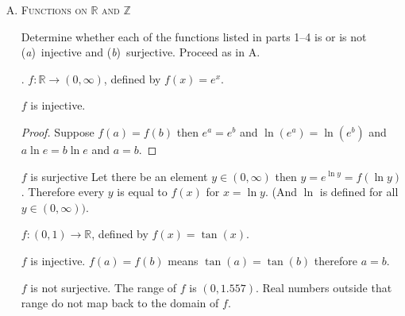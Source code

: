 \documentclass[twoside]{amsart}
\newcommand{\solution}{\textsc{Solution}\xspace}
\begin{document}
\begin{enumerate}[A.]
   . $f(x) = \displaystyle
      \begin{cases}
         2x      &\text{if $x$ is an integer}\\
	 \phantom{2}x &\text{otherwise}
      \end{cases}$

   \noindent $f$ is injective. 
   \begin{proof}
   $f(x)$ is an integer iff $x$ is an integer. Suppose $f(a)=f(b)$ and
   $f(a)$ is an integer. Then $2a=2b$ and $a=b$. Now suppose $f(a)=f(b)$
   and $f(a)$ is not an integer. Then $a=b$.
   \end{proof}

   \noindent $f$ is not surjective. For example, there is no value of
   $x$ for which $f(x)=1$. Why not? Well there are only two values that
   are even worthy of consideration: 1/2 and 1. But $f(1/2)=1/2$ because
   $1/2$ is not an integer; and $f(1)=2$ because 1 is an integer.

   . Determine the range of each of the functions in parts 1 to 6.

   \noindent \solution 1) $\mathbb{R}$, 2) $\mathbb{R}$, 3)
   $\{x: x\in\mathbb{R}, x\ge0\}$, (non-negative reals) 4) $\mathbb{R}$,
   5) $\mathbb{R}$ 6) the reals minus the odd integers.

   \item \textsc{Functions on} $\mathbb{R}$ \textsc{and} $\mathbb{Z}$

   \noindent Determine whether each of the functions listed in parts
   1--4 is or is not (\emph{a})~injective and (\emph{b})~surjective. 
   Proceed as in A.

   . $f:\mathbb{R}\to(0,\infty)$, defined by $f(x)=e^x$.

   \noindent $f$ is injective.
   \begin{proof}
   Suppose $f(a)=f(b)$ then $e^a=e^b$ and $\ln(e^a)=\ln(e^b)$ and
   $a\ln e = b\ln e$ and $a=b$.
   \end{proof}

   \noindent $f$ is surjective
   Let there be an element $y \in (0,\infty)$ then $y=e^{\ln y}=f(\ln y)$.
   Therefore every $y$ is equal to $f(x)$ for $x=\ln y$. (And $\ln$ is defined
   for all $y \in (0,\infty))$.

    $f:(0,1)\to\mathbb{R}$, defined by $f(x)=\tan(x)$.

   \noindent $f$ is injective. $f(a)=f(b)$ means $\tan(a)=\tan(b)$
   therefore $a=b$.

   \noindent $f$ is not surjective. The range of $f$ is $(0,1.557)$. Real 
   numbers outside that range do not map back to the domain of $f$.


\end{enumerate}
\end{document}
